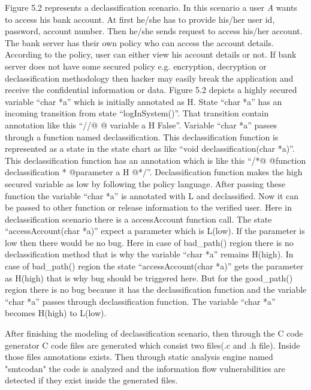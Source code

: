 Figure 5.2 represents a declassification scenario. In this scenario a user \emph{A} wants to access his bank account. At first he/she has to provide his/her user id, password, account number. Then he/she sends request to access his/her account. The bank server has their own policy who can access the account details. According to the policy, user can either view his account details or not. If bank server does not have some secured policy e.g. encryption, decryption or declassification methodology then hacker may easily break the application and receive the confidential information or data. Figure 5.2 depicts a highly secured variable \enquote{char *a} which is initially annotated as H. State \enquote{char *a} has an incoming transition from state \enquote{logInSystem()}. That transition contain annotation like this \enquote{//@ @ variable a H False}. Variable \enquote{char *a} passes through a function named declassification. This declassification function is represented as a state in the state chart as like \enquote{void declassification(char *a)}. This declassification function has an annotation which is like this \enquote{/*@ @function declassification * @parameter a H @*/}. Declassification function makes the high secured variable as low by following the policy language. After passing these function the variable \enquote{char *a} is annotated with L and declassified. Now it can be passed to other function or release information to the verified user. Here in declassification scenario there is a accessAccount function call. The state \enquote{accessAccount(char *a)} expect a parameter which is L(low). If the parameter is low then there would be no bug. Here in case of bad\_path() region there is no declassification method that is why the variable \enquote{char *a} remains H(high). In case of bad\_path() region the state \enquote{accessAccount(char *a)} gets the parameter as H(high) that is why bug should be triggered here. But for the good\_path() region there is no bug because it has the declassification function and the variable \enquote{char *a} passes through declassification function. The variable \enquote{char *a} becomes H(high) to L(low).

After finishing the modeling of declassification scenario, then through the C code generator C code files are generated which consist two files(.c and .h file). Inside those files annotations exists. Then through static analysis engine named "smtcodan" the code is analyzed and the information flow vulnerabilities are  detected if they exist inside the generated files.
 



